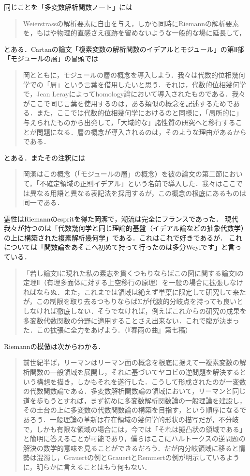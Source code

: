 \documentclass[uplatex, dvipdfmx]{jsreport}
\begin{document}
\begin{tcolorbox}[colframe=ForestGreen, colback=ForestGreen!10!white, breakable ,colbacktitle=ForestGreen!40!white, coltitle=black,fonttitle=\bfseries\sffamily,
    title=岡の第七論文]
\begin{quote}
    \end{quote}
    同じことを「多変数解析関数ノート」には
    \begin{quote}
        Weierstrassの解析要素に自由を与え，しかも同時にRiemannの解析要素を，もはや物理的直感さえ痕跡を留めないような一般的な場に延長して，
    \end{quote}
    とある．Cartanの論文「複素変数の解析関数のイデアルとモジュール」の第Ⅱ部「モジュールの層」の冒頭では
    \begin{quote}
        岡とともに，モジュールの層の概念を導入しよう．我々は代数的位相幾何学での「層」という言葉を借用したいと思う．それは，代数的位相幾何学で，Jean Lerayによってhomology論において導入されたものである．我々がここで同じ言葉を使用するのは，ある類似の概念を記述するためである．また，ここでは代数的位相幾何学におけるのと同様に，「局所的に」与えられたものから出発して，「大域的な」諸性質の研究へと移行することが問題になる．層の概念が導入されるのは，そのような理由があるからである．
    \end{quote}
    とある．またその注釈には
    \begin{quote}
        岡潔はこの概念（「モジュールの層」の概念）を彼の論文の第二節において，「不確定領域の正則イデアル」という名前で導入した．我々はここでは異なる用語と異なる表記法を採用するが，この概念の根底にあるものは同一である．
    \end{quote}
    霊性はRiemannのespritを得た岡潔で，潮流は完全にフランスであった．
    現代我々が持つのは「代数幾何学と同じ理論的基盤（イデアル論などの抽象代数学）の上に構築された複素解析幾何学」である．これはこれで好きであるが．
    これについては「関数論をあそこへ初めて持って行ったのは多分Weylです」と言っている．
    \begin{quote}
        「若し論文Ⅰに現れた私の素志を貫くつもりならばこの図に関する論文Ⅰの定理Ⅱ（有理多面体に対する上空移行の原理）を一般の場合に拡張しなければならぬ．また，これまでは領域は絶えず単葉に限定して研究して来たが，この制限を取り去るつもりならばΣが代数的分岐点を持っても良いとしなければ徹底しない．そうでなければ，例えばこれからの研究の成果を多変数代数関数の分野に適用することさえ出来ない．これで腹が決まった．この拡張に全力をあげよう．（『春雨の曲』第七稿）
    \end{quote}
    Riemannの模倣は次からわかる．
    \begin{quote}
        前世紀半ば，リーマンはリーマン面の概念を根底に据えて一複素変数の解析関数の一般領域を展開し，それに基づいてヤコビの逆問題を解決するという構想を描き，しかもそれを遂行した．こうして形成されたのが一変数の代数関数論である．多変数解析関数論の領域において，リーマンと同じ道を歩もうとすれば，まず初めに多変数解析関数論の一般理論を建設し，その土台の上に多変数の代数関数論の構築を目指す，という順序になるであろう．一般理論の革新は存在領域の幾何学的形状の描写だが，不分岐で，しかも有限な領域の場合には，今では「それは擬凸状の領域である」と簡明に答えることが可能であり，僕らはここにハルトークスの逆問題の解決の数学的意味を見ることができるだろう．だが内分岐領域に移ると情勢は混濁し，Grauertの例とGrauertとRemmertの例が明示しているように，明らかに言えることはもう何もない．

\end{quote}
\end{tcolorbox}
\end{document}
